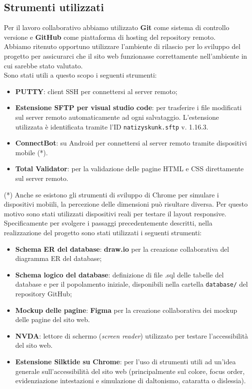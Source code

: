 \subsection{Strumenti utilizzati}
Per il lavoro collaborativo abbiamo utilizzato \textbf{Git} come sistema di controllo versione e \textbf{GitHub} come piattaforma di hosting del repository remoto.\\
Abbiamo ritenuto opportuno utilizzare l'ambiente di rilascio per lo sviluppo del progetto per assicurarci che il sito web funzionasse correttamente nell'ambiente in cui sarebbe stato valutato.\\
Sono stati utili a questo scopo i seguenti strumenti:
\begin{itemize}
    \item \textbf{PUTTY}: client SSH per connettersi al server remoto;
    \item \textbf{Estensione SFTP per visual studio code}: per trasferire i file modificati sul server remoto automaticamente ad ogni salvataggio. L'estensione utilizzata è identificata tramite l'ID \texttt{natizyskunk.sftp} v. 1.16.3.
    \item \textbf{ConnectBot}: su Android per connettersi al server remoto tramite dispositivi mobile (*).
    \item \textbf{Total Validator}: per la validazione delle pagine HTML e CSS direttamente sul server remoto.
\end{itemize}
(*) Anche se esistono gli strumenti di sviluppo di Chrome per simulare i dispositivi mobiili, la percezione delle dimensioni può risultare diversa. Per questo motivo sono stati utilizzati dispositivi reali per testare il layout responsive.\\ 
Specificamente per svolgere i passaggi precedentemente descritti, nella realizzazione del progetto sono stati utilizzati i seguenti strumenti:
\begin{itemize}
    \label{sec:strumenti_utilizzati}
    \item \textbf{Schema ER del database}: \textbf{draw.io} per la creazione collaborativa del diagramma ER del database;
    \item \textbf{Schema logico del database}: definizione di file .sql delle tabelle del database e per il popolamento iniziale, disponibili nella cartella \texttt{database/} del repository GitHub;
    \item \textbf{Mockup delle pagine}: \textbf{Figma} per la creazione collaborativa dei mockup delle pagine del sito web.
    \item \textbf{NVDA}: lettore di schermo (\textit{screen reader}) utilizzato per testare l'accessibilità del sito web.
    \item \textbf{Estensione Silktide su Chrome}: per l'uso di strumenti utili ad un'idea generale sull'accessibilità del sito web (principalmente sul colore, focus order, evidenziazione intestazioni e simulazione di daltonismo, cataratta o dislessia).
\end{itemize}

